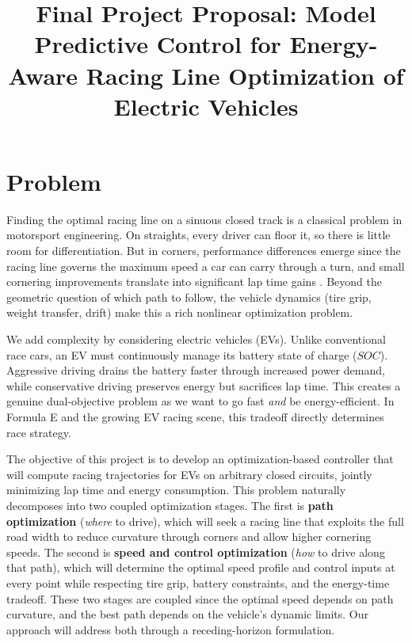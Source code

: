 \documentclass[twoside,11pt]{article}
\begin{document}
\title{Final Project Proposal: Model Predictive Control for Energy-Aware Racing Line Optimization of Electric Vehicles}
\newcommand{\shorttitle}{Energy-Aware EV Racing MPC}



\maketitle

\section{Problem}
\vspace{-0.05in}

Finding the optimal racing line on a sinuous closed track is a classical problem in motorsport engineering. On straights, every driver can floor it, so there is little room for differentiation. But in corners, performance differences emerge since the racing line governs the maximum speed a car can carry through a turn, and small cornering improvements translate into significant lap time gains \citep{Xiong2010}. Beyond the geometric question of which path to follow, the vehicle dynamics (tire grip, weight transfer, drift) make this a rich nonlinear optimization problem.

We add complexity by considering electric vehicles (EVs). Unlike conventional race cars, an EV must continuously manage its battery state of charge ($SOC$). Aggressive driving drains the battery faster through increased power demand, while conservative driving preserves energy but sacrifices lap time. This creates a genuine dual-objective problem as we want to go fast \textit{and} be energy-efficient. In Formula E and the growing EV racing scene, this tradeoff directly determines race strategy.

The objective of this project is to develop an optimization-based controller that will compute racing trajectories for EVs on arbitrary closed circuits, jointly minimizing lap time and energy consumption. This problem naturally decomposes into two coupled optimization stages. The first is \textbf{path optimization} (\textit{where} to drive), which will seek a racing line that exploits the full road width to reduce curvature through corners and allow higher cornering speeds. The second is \textbf{speed and control optimization} (\textit{how} to drive along that path), which will determine the optimal speed profile and control inputs at every point while respecting tire grip, battery constraints, and the energy-time tradeoff. These two stages are coupled since the optimal speed depends on path curvature, and the best path depends on the vehicle's dynamic limits. Our approach will address both through a receding-horizon formulation.
\end{document}
